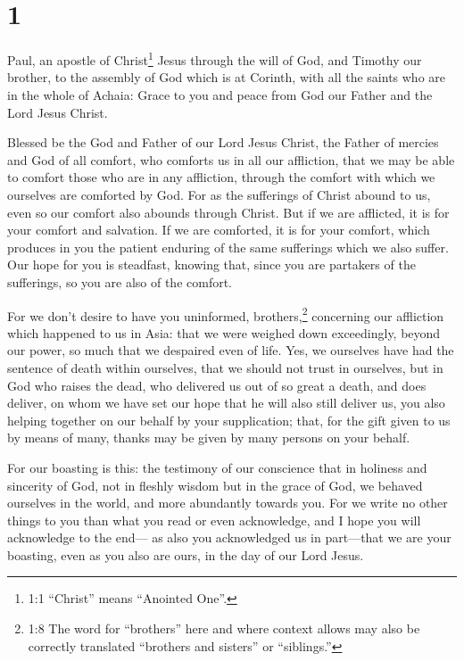 \hypertarget{section}{%
\section{1}\label{section}}

 Paul, an apostle of Christ\footnote{1:1 ``Christ'' means
  ``Anointed One''.} Jesus through the will of God, and Timothy our
brother, to the assembly of God which is at Corinth, with all the saints
who are in the whole of Achaia:  Grace to you and peace from
God our Father and the Lord Jesus Christ.

 Blessed be the God and Father of our Lord Jesus Christ, the
Father of mercies and God of all comfort,  who comforts us
in all our affliction, that we may be able to comfort those who are in
any affliction, through the comfort with which we ourselves are
comforted by God.  For as the sufferings of Christ abound to
us, even so our comfort also abounds through Christ.  But if
we are afflicted, it is for your comfort and salvation. If we are
comforted, it is for your comfort, which produces in you the patient
enduring of the same sufferings which we also suffer.  Our
hope for you is steadfast, knowing that, since you are partakers of the
sufferings, so you are also of the comfort.

 For we don't desire to have you uninformed,
brothers,\footnote{1:8 The word for ``brothers'' here and where context
  allows may also be correctly translated ``brothers and sisters'' or
  ``siblings.''} concerning our affliction which happened to us in Asia:
that we were weighed down exceedingly, beyond our power, so much that we
despaired even of life.  Yes, we ourselves have had the
sentence of death within ourselves, that we should not trust in
ourselves, but in God who raises the dead,  who delivered
us out of so great a death, and does deliver, on whom we have set our
hope that he will also still deliver us,  you also helping
together on our behalf by your supplication; that, for the gift given to
us by means of many, thanks may be given by many persons on your behalf.

 For our boasting is this: the testimony of our conscience
that in holiness and sincerity of God, not in fleshly wisdom but in the
grace of God, we behaved ourselves in the world, and more abundantly
towards you.  For we write no other things to you than what
you read or even acknowledge, and I hope you will acknowledge to the
end---  as also you acknowledged us in part---that we are
your boasting, even as you also are ours, in the day of our Lord Jesus.

